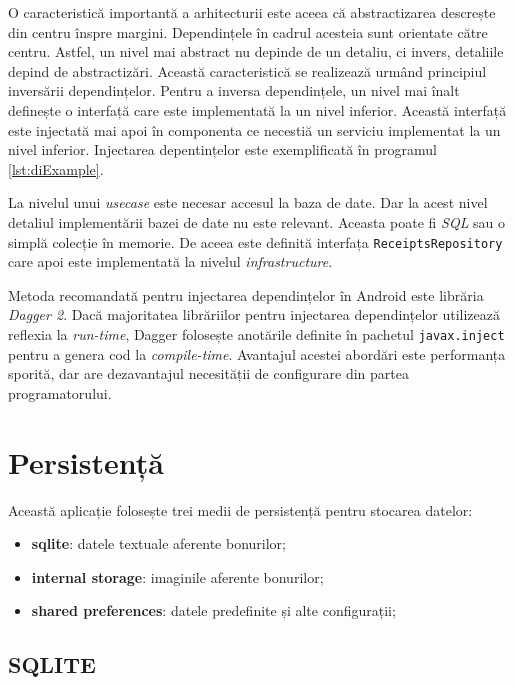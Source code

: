 O caracteristică importantă a arhitecturii este aceea că abstractizarea descrește din centru înspre margini. Dependințele în cadrul acesteia sunt orientate către centru. Astfel, un nivel mai abstract nu depinde de un detaliu, ci invers, detaliile depind de abstractizări. Această caracteristică se realizează urmând principiul inversării dependințelor. Pentru a inversa dependințele, un nivel mai înalt definește o interfață care este implementată la un nivel inferior. Această interfață este injectată mai apoi în componenta ce necestiă un serviciu implementat la un nivel inferior. Injectarea depentințelor este exemplificată în programul \ref{lst:diExample}.



La nivelul unui \emph{usecase} este necesar accesul la baza de date. Dar la acest nivel detaliul implementării bazei de date nu este relevant. Aceasta poate fi \emph{SQL} sau o simplă colecție în memorie. De aceea este definită interfața \texttt{ReceiptsRepository} care apoi este implementată la nivelul \emph{infrastructure}.

Metoda recomandată pentru injectarea dependințelor în Android este librăria \emph{Dagger 2}. Dacă majoritatea librăriilor pentru injectarea dependințelor utilizează reflexia la \emph{run-time}, Dagger folosește anotările definite în pachetul \texttt{javax.inject} pentru a genera cod la \emph{compile-time}. Avantajul acestei abordări este performanța sporită, dar are dezavantajul necesității de configurare din partea programatorului.

\section{Persistență}

Această aplicație folosește trei medii de persistență pentru stocarea datelor:

\begin{itemize}
\item
  \textbf{sqlite}: datele textuale aferente bonurilor;
\item
  \textbf{internal storage}: imaginile aferente bonurilor;
\item
  \textbf{shared preferences}: datele predefinite și alte configurații;
\end{itemize}

\subsection{SQLITE}\label{sqlite}

